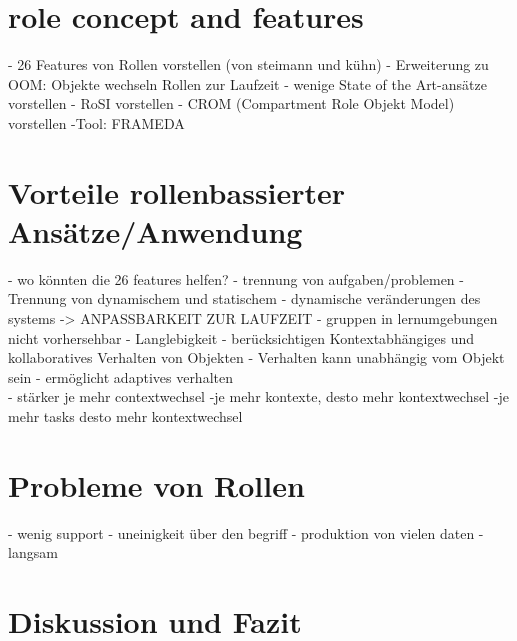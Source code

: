 \documentclass[conference]{IEEEtran}
\begin{document}
\section{role concept and features}
- 26 Features von Rollen vorstellen (von steimann und kühn)
- Erweiterung zu OOM: Objekte wechseln Rollen zur Laufzeit
- wenige State of the Art-ansätze vorstellen
- RoSI vorstellen
	- CROM (Compartment Role Objekt Model) vorstellen
		-Tool: FRAMEDA

\section{Vorteile rollenbassierter Ansätze/Anwendung}
- wo könnten die 26 features helfen? 
- trennung von aufgaben/problemen
- Trennung von dynamischem und statischem
- dynamische veränderungen des systems -> ANPASSBARKEIT ZUR LAUFZEIT
	- gruppen in lernumgebungen nicht vorhersehbar
- Langlebigkeit
- berücksichtigen Kontextabhängiges und kollaboratives Verhalten von Objekten \cite{family}
- Verhalten kann unabhängig vom Objekt sein - ermöglicht adaptives verhalten\\
- stärker je mehr contextwechsel
	-je mehr kontexte, desto mehr kontextwechsel
		-je mehr tasks desto mehr kontextwechsel
\section{Probleme von Rollen}
- wenig support
- uneinigkeit über den begriff 
- produktion von vielen daten
- langsam \cite{bachman}


\section{Diskussion und Fazit}

{}

\end{document}
